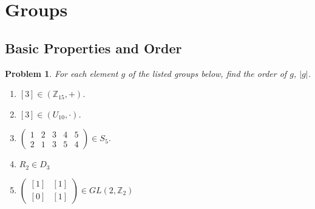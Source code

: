\documentclass[12pt]{article}
\newtheorem{problem}{Problem}
\numberwithin{problem}{section} %
\theoremstyle{remark}  %
\begin{document}
 
%
\rhead{\today}


\setcounter{section}{1}
\section{Groups}
\setcounter{subsection}{1}
\subsection{Basic Properties and Order}
\setcounter{problem}{37}
\renewcommand{\thefootnote}{\fnsymbol{footnote}}
    \begin{problem}
        For each element $g$ of the listed groups below, find the order of $g$, $|g|$.
        \begin{multicols}{3}
            \begin{enumerate}[label=(\alph*)]
                \item $[3] \in (\mathbb{Z}_{15}, +)$.
                \item $[3] \in (U_{10}, \cdot)$.
                \setcounter{enumi}{4}
                \item $\begin{pmatrix}
                    1 & 2 & 3 & 4 & 5 \\
                    2 & 1 & 3 & 5 & 4
                \end{pmatrix} \in S_5$.
                \item $R_2\in D_3$
                \item $\begin{pmatrix}
                    [1] & [1] \\
                    [0] & [1]
                \end{pmatrix} \in GL(2,\mathbb{Z}_2)$
            \end{enumerate}
        \end{multicols}
    \end{problem}
\end{document}
